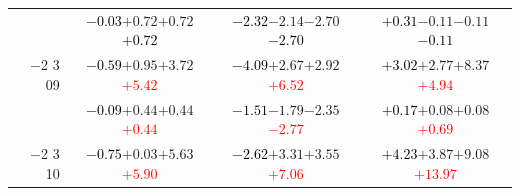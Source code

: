 \documentclass[compress]{beamer}
\begin{document}
\begin{frame}
\begin{tabular}{r | c | c | c}
          & \textcolor{black}{$-0.03$}\hspace{0.1 cm}$+0.72$\hspace{0.1 cm}$+0.72$\hspace{0.1 cm}\textcolor{black}{$+0.72$} & \textcolor{black}{$-2.32$}\hspace{0.1 cm}$-2.14$\hspace{0.1 cm}$-2.70$\hspace{0.1 cm}\textcolor{black}{$-2.70$} & \textcolor{black}{$+0.31$}\hspace{0.1 cm}$-0.11$\hspace{0.1 cm}$-0.11$\hspace{0.1 cm}\textcolor{black}{$-0.11$} \\
$-$2 3 09 & \textcolor{black}{$-0.59$}\hspace{0.1 cm}$+0.95$\hspace{0.1 cm}$+3.72$\hspace{0.1 cm}\textcolor{red}{$+5.42$} & \textcolor{black}{$-4.09$}\hspace{0.1 cm}$+2.67$\hspace{0.1 cm}$+2.92$\hspace{0.1 cm}\textcolor{red}{$+6.52$} & \textcolor{black}{$+3.02$}\hspace{0.1 cm}$+2.77$\hspace{0.1 cm}$+8.37$\hspace{0.1 cm}\textcolor{red}{$+4.94$} \\
          & \textcolor{black}{$-0.09$}\hspace{0.1 cm}$+0.44$\hspace{0.1 cm}$+0.44$\hspace{0.1 cm}\textcolor{red}{$+0.44$} & \textcolor{black}{$-1.51$}\hspace{0.1 cm}$-1.79$\hspace{0.1 cm}$-2.35$\hspace{0.1 cm}\textcolor{red}{$-2.77$} & \textcolor{black}{$+0.17$}\hspace{0.1 cm}$+0.08$\hspace{0.1 cm}$+0.08$\hspace{0.1 cm}\textcolor{red}{$+0.69$} \\
$-$2 3 10 & \textcolor{black}{$-0.75$}\hspace{0.1 cm}$+0.03$\hspace{0.1 cm}$+5.63$\hspace{0.1 cm}\textcolor{red}{$+5.90$} & \textcolor{black}{$-2.62$}\hspace{0.1 cm}$+3.31$\hspace{0.1 cm}$+3.55$\hspace{0.1 cm}\textcolor{red}{$+7.06$} & \textcolor{black}{$+4.23$}\hspace{0.1 cm}$+3.87$\hspace{0.1 cm}$+9.08$\hspace{0.1 cm}\textcolor{red}{$+13.97$} \\

\end{tabular}
\end{frame}
\end{document}
